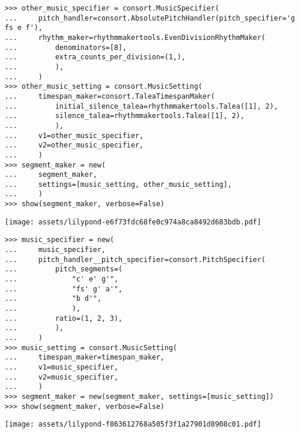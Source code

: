 \begin{singlespacing}
\vspace{-0.5\baselineskip}
\begin{lstlisting}
>>> other_music_specifier = consort.MusicSpecifier(
...     pitch_handler=consort.AbsolutePitchHandler(pitch_specifier='g fs e f'),
...     rhythm_maker=rhythmmakertools.EvenDivisionRhythmMaker(
...         denominators=[8],
...         extra_counts_per_division=(1,),
...         ),
...     )
>>> other_music_setting = consort.MusicSetting(
...     timespan_maker=consort.TaleaTimespanMaker(
...         initial_silence_talea=rhythmmakertools.Talea([1], 2),
...         silence_talea=rhythmmakertools.Talea([1], 2),
...         ),
...     v1=other_music_specifier,
...     v2=other_music_specifier,
...     )
>>> segment_maker = new(
...     segment_maker,
...     settings=[music_setting, other_music_setting],
...     )
>>> show(segment_maker, verbose=False)
\end{lstlisting}
\noindent\texttt{[image: assets/lilypond-e6f73fdc68fe0c974a8ca8492d683bdb.pdf]}
\end{singlespacing}

\begin{comment}
<abjad>[stylesheet=../consort.ily]
music_specifier = new(
    music_specifier,
    pitch_handler__pitch_specifier=consort.PitchSpecifier(
        pitch_segments=(
            "c' e' g'",
            "fs' g' a'",
            "b d'",
            ),
        ratio=(1, 2, 3),
        ),
    )
music_setting = consort.MusicSetting(
    timespan_maker=timespan_maker,
    v1=music_specifier,
    v2=music_specifier,
    )
segment_maker = new(segment_maker, settings=[music_setting])
show(segment_maker, verbose=False)
</abjad>
\end{comment}

\begin{singlespacing}
\vspace{-0.5\baselineskip}
\begin{lstlisting}
>>> music_specifier = new(
...     music_specifier,
...     pitch_handler__pitch_specifier=consort.PitchSpecifier(
...         pitch_segments=(
...             "c' e' g'",
...             "fs' g' a'",
...             "b d'",
...             ),
...         ratio=(1, 2, 3),
...         ),
...     )
>>> music_setting = consort.MusicSetting(
...     timespan_maker=timespan_maker,
...     v1=music_specifier,
...     v2=music_specifier,
...     )
>>> segment_maker = new(segment_maker, settings=[music_setting])
>>> show(segment_maker, verbose=False)
\end{lstlisting}
\noindent\texttt{[image: assets/lilypond-f863612768a505f3f1a27901d8908c01.pdf]}
\end{singlespacing}

